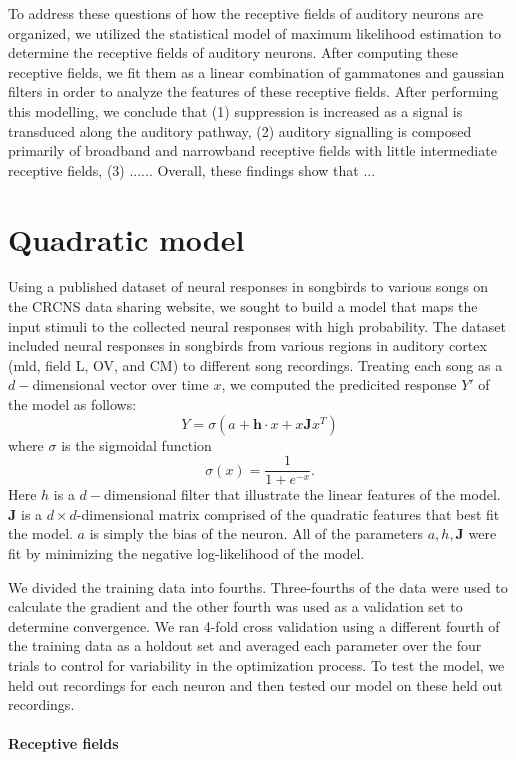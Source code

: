 \documentclass{article}
\begin{document}
To address these questions of how the receptive fields of auditory neurons are organized, we utilized the statistical model of maximum likelihood estimation to determine the receptive fields of auditory neurons. After computing these receptive fields, we fit them as a linear combination of gammatones and gaussian filters in order to analyze the features of these receptive fields. After performing this modelling, we conclude that (1) suppression is increased as a signal is transduced along the auditory pathway, (2) auditory signalling is composed primarily of broadband and narrowband receptive fields with little intermediate receptive fields, (3) ...... Overall, these findings show that ...

\section{Quadratic model}

Using a published dataset of neural responses in songbirds to various songs on the CRCNS data sharing website, we sought to build a model that maps the input stimuli to the collected neural responses with high probability. The dataset included neural responses in songbirds from various regions in auditory cortex (mld, field L, OV, and CM) to different song recordings. Treating each song as a $d-$dimensional vector over time $x$, we computed the predicited response $Y'$ of the model as follows:
$$
Y = \sigma(a + \mathbf{h}\cdot x + x\mathbf{J}x^T)
$$ where $\sigma$ is the sigmoidal function
$$\sigma(x) = \frac{1}{1+e^{-x}}.$$ Here $h$ is a $d-$dimensional filter that illustrate the linear features of the model. $\mathbf{J}$ is a $d\times d$-dimensional matrix comprised of the quadratic features that best fit the model. $a$ is simply the bias of the neuron. All of the parameters $a, h, \mathbf{J}$ were fit by minimizing the negative log-likelihood of the model.

We divided the training data into fourths. Three-fourths of the data were used to calculate the gradient and the other fourth was used as a validation set to determine convergence. We ran 4-fold cross validation using a different fourth of the training data as a holdout set and averaged each parameter over the four trials to control for variability in the optimization process. To test the model, we held out recordings for each neuron and then tested our model on these held out recordings.

\paragraph{Receptive fields}
\end{document}
